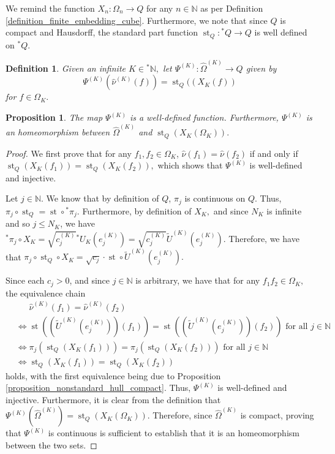 \documentclass[10pt,a4paper]{amsart}
\newtheorem{prop}[thm]{Proposition}
\newtheorem{definition}[thm]{Definition}
\def \St{\operatorname{st}}
\def \HOM{\hat{\Omega}}
\def \HNU{\hat{\nu}}
\begin{document}
We remind the function $X_n:\Omega_n\rightarrow Q$ for any $n\in\mathbb{N}$ as per Definition \ref{definition_finite_embedding_cube}. Furthermore, we note that since $Q$ is compact and Hausdorff, the standard part function $\St_Q:{}^*Q\rightarrow Q$ is well defined on ${}^*Q$.

\begin{definition}
	Given an infinite $K\in{}^*\mathbb{N},$ let $\Psi^{(K)}:\HOM^{(K)}\rightarrow Q$ given by $$\Psi^{(K)}(\HNU^{(K)}(f))=\St_Q((X_K(f))$$ for $f\in\Omega_K.$
\end{definition}
\begin{prop}
	The map $\Psi^{(K)}$ is a well-defined function. Furthermore, $\Psi^{(K)}$ is an homeomorphism between $\HOM^{(K)}$ and $\St_Q\left(X_K(\Omega_K)\right).$
\end{prop}
\begin{proof}
	We first prove that for any $f_1,f_2\in\Omega_K$, $\HNU(f_1)=\HNU(f_2)$ if and only if $\St_Q(X_K(f_1))=\St_Q(X_K(f_2)),$ which shows that $\Psi^{(K)}$ is well-defined and injective. %
	
	Let $j\in\mathbb{N}$. We know that by definition of $Q$, $\pi_j$ is continuous on $Q$. Thus, $\pi_j\circ \St_Q=\St\circ{}^*\pi_j.$ Furthermore, by definition of $X_K,$ and since $N_K$ is infinite and so $j\leq N_K$, we have ${}^*\pi_j\circ X_K=\sqrt{c_j^{(K)}}{}^*U_K(e_j^{(K)})=\sqrt{c_j^{(K)}}\tilde{U}^{(K)}(e_j^{(K)}).$ Therefore, we have that $\pi_j\circ \St_Q\circ X_K=\sqrt{c_j}\cdot\St\circ \tilde{U}^{(K)}(e_j^{(K)}).$ 
	
	Since each $c_j>0$, and since $j\in\mathbb{N}$ is arbitrary, we have that for any $f_1 f_2\in\Omega_K,$ the equivalence chain
	\begin{align*}
		&\phantom{{}\iff{}} \HNU^{(K)}(f_1)=\HNU^{(K)}(f_2)\\
		 &\iff \St((\tilde{U}^{(K)}(e_j^{(K)}))(f_1))=\St((\tilde{U}^{(K)}(e_j^{(K)}))(f_2)) \text{ for all $j\in\mathbb{N}$ }\\
		 &\iff \pi_j(\St_Q(X_K(f_1)))=\pi_j(\St_Q(X_K(f_2)))\text{ for all $j\in\mathbb{N}$ }\\
		 &\iff \St_Q(X_K(f_1))=\St_Q(X_K(f_2))
	\end{align*}
	holds, with the first equivalence being due to Proposition  \ref{proposition_nonstandard_hull_compact}. Thus, $\Psi^{(K)}$ is well-defined and injective. Furthermore, it is clear from the definition that $\Psi^{(K)}(\HOM^{(K)})=\St_Q(X_K(\Omega_K)).$ Therefore, since $\HOM^{(K)}$ is compact, proving that $\Psi^{(K)}$ is continuous is sufficient to establish that it is an homeomorphism between the two sets.%
	

\end{proof}
\end{document}
